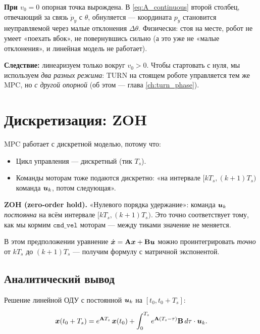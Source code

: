 \begin{warnbox}
\textbf{При $v_0 = 0$} опорная точка вырождена. В \eqref{eq:A_continuous}
второй столбец, отвечающий за связь $\dot{p}_y$ с $\theta$, обнуляется ---
координата $p_y$ становится неуправляемой через малые отклонения
$\Delta\theta$. Физически: стоя на месте, робот не умеет «поехать вбок»,
не повернувшись сильно (а это уже не «малые отклонения», и линейная
модель не работает).

\textbf{Следствие:} линеаризуем только вокруг $v_0 > 0$. Чтобы стартовать
с нуля, мы используем \emph{два разных режима}: TURN на стоящем роботе
управляется тем же MPC, но \emph{с другой опорной} (об этом --- глава
\ref{ch:turn_phase}).
\end{warnbox}

\section{Дискретизация: ZOH}

MPC работает с дискретной моделью, потому что:

\begin{itemize}
  \item Цикл управления --- дискретный (тик $T_s$).
  \item Команды моторам тоже подаются дискретно: «на интервале $[k T_s,
        (k+1) T_s)$ команда $\bm{u}_k$, потом следующая».
\end{itemize}

\begin{ideabox}
\textbf{ZOH (zero-order hold).} «Нулевого порядка удержание»: команда
$\bm{u}_k$ \emph{постоянна} на всём интервале $[k T_s, (k+1)T_s)$.
Это точно соответствует тому, как мы кормим $\texttt{cmd\_vel}$
моторам --- между тиками значение не меняется.

В этом предположении уравнение $\dot{\bm{x}} = \mathbf{A}\bm{x} +
\mathbf{B}\bm{u}$ можно проинтегрировать \emph{точно} от $kT_s$ до
$(k+1)T_s$ --- получим формулу с матричной экспонентой.
\end{ideabox}

\subsection{Аналитический вывод}

Решение линейной ОДУ с постоянной $\bm{u}_k$ на $[t_0, t_0 + T_s]$:

\[
  \bm{x}(t_0 + T_s)
    = e^{\mathbf{A} T_s}\,\bm{x}(t_0)
    + \int_0^{T_s} e^{\mathbf{A}(T_s - \tau)}\mathbf{B}\,d\tau \cdot \bm{u}_k.
\]

